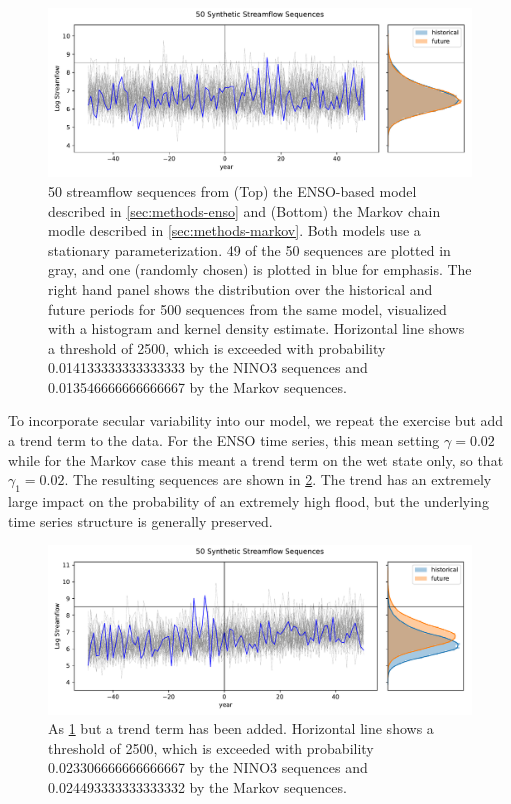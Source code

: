 \documentclass[11pt]{article}
\begin{document}
\begin{figure}[b]
  \includegraphics[width=\textwidth]{stationary_sequences.pdf}  
  \caption{
    50 streamflow sequences from (Top) the ENSO-based model described in \cref{sec:methods-enso} and (Bottom) the Markov chain modle described in \cref{sec:methods-markov}.
    Both models use a stationary parameterization.
    49 of the 50 sequences are plotted in gray, and one (randomly chosen) is plotted in blue for emphasis.
    The right hand panel shows the distribution over the historical and future periods for 500 sequences from the same model, visualized with a histogram and kernel density estimate.
    Horizontal line shows a threshold of \num{2500}, which is exceeded with probability \num{0.014133333333333333} by the NINO3 sequences and \num{0.013546666666666667} by the Markov sequences.\label{fig:stationary-sequences}
  }
\end{figure}

To incorporate secular variability into our model, we repeat the exercise but add a trend term to the data.
For the ENSO time series, this mean setting \(\gamma=0.02\) while for the Markov case this meant a trend term on the wet state only, so that \(\gamma_1=0.02\).
The resulting sequences are shown in \cref{fig:trend-sequences}.
The trend has an extremely large impact on the probability of an extremely high flood, but the underlying time series structure is generally preserved.
\begin{figure}[b]
  \includegraphics[width=\textwidth]{trend_sequences.pdf}
  \caption{
    As \cref{fig:stationary-sequences} but a trend term has been added.
    Horizontal line shows a threshold of \num{2500}, which is exceeded with probability \num{0.023306666666666667} by the NINO3 sequences and \num{0.024493333333333332} by the Markov sequences.\label{fig:trend-sequences}
  }
\end{figure}
\end{document}
